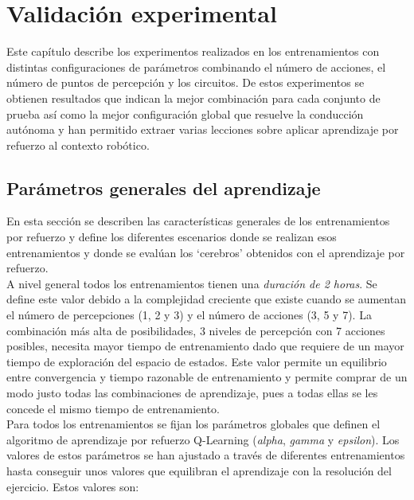 \chapter{Validación experimental}\label{resultados}

Este capítulo describe los experimentos realizados en los entrenamientos con distintas configuraciones de parámetros combinando el número de acciones, el número de puntos de percepción y los circuitos. De estos experimentos se obtienen resultados que indican la mejor combinación para cada conjunto de prueba así como la mejor configuración global que resuelve la conducción autónoma y han permitido extraer varias lecciones sobre aplicar aprendizaje por refuerzo al contexto robótico.\\

\section{Parámetros generales del aprendizaje}\label{parametros-generales}

En esta sección se describen las características generales de los entrenamientos por refuerzo y define los diferentes escenarios donde se realizan esos entrenamientos y donde se evalúan los `cerebros' obtenidos con el aprendizaje por refuerzo.\\

A nivel general todos los entrenamientos tienen una \textit{duración de 2 horas}. Se define este valor debido a la complejidad creciente que existe cuando se aumentan el número de percepciones (1, 2 y 3) y el número de acciones (3, 5 y 7). La combinación más alta de posibilidades, 3 niveles de percepción con 7 acciones posibles, necesita mayor tiempo de entrenamiento dado que requiere de un mayor tiempo de exploración del espacio de estados. Este valor permite un equilibrio entre convergencia y tiempo razonable de entrenamiento y permite comprar de un modo justo todas las combinaciones de aprendizaje, pues a todas ellas se les concede el mismo tiempo de entrenamiento.\\

Para todos los entrenamientos se fijan los parámetros globales que definen el algoritmo de aprendizaje por refuerzo Q-Learning (\textit{alpha}, \textit{gamma} y \textit{epsilon}). Los valores de estos parámetros se han ajustado a través de diferentes entrenamientos hasta conseguir unos valores que equilibran el aprendizaje con la resolución del ejercicio. Estos valores son:\\

